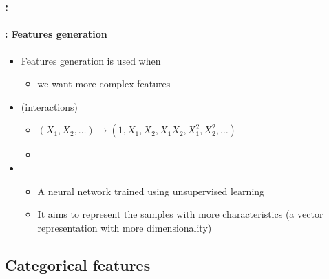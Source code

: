 \documentclass[xcolor=table]{beamer}
\begin{document}
\begin{frame}
	\frametitle{\insertshortsubtitle: \insertsection}
	\framesubtitle{\insertsubsection: Features generation}
	
			
			\begin{itemize}
				\item Features generation is used when
				\begin{itemize}
					\item we want more complex features
				\end{itemize}
				\item {} (interactions)
				\begin{itemize}
					\item $(X_1, X_2, \ldots) \longrightarrow (1, X_1, X_2, X_1 X_2, X_1^2, X_2^2, \ldots)$
					\item {}
				\end{itemize}
				\item {}
				\begin{itemize}
					\item A neural network trained using unsupervised learning
					\item It aims to represent the samples with more characteristics (a vector representation with more dimensionality)
				\end{itemize}
			\end{itemize}
	
\end{frame}

\subsection{Categorical features}
\end{document}
